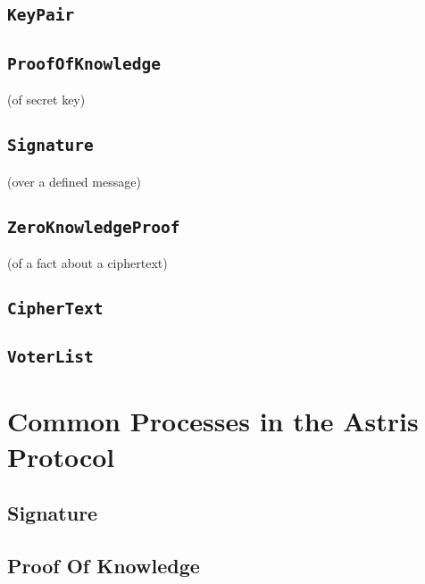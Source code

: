 \section*{\texttt{KeyPair}}
\label{dt:elgamal:keypair}


\section*{\texttt{ProofOfKnowledge}}
\label{dt:elgamal:pok}
(of secret key)

\section*{\texttt{Signature}}
\label{dt:elgamal:sig}
(over a defined message)

\section*{\texttt{ZeroKnowledgeProof}}
\label{dt:elgamal:zkp}
(of a fact about a ciphertext)

\section*{\texttt{CipherText}}
\label{dt:elgamal:ct}

\section*{\texttt{VoterList}}
\label{dt:setup:voterlist}


\chapter{Common Processes in the Astris Protocol}
\label{appendix:processes}

\section*{Signature}
\label{proc:sign}



\section*{Proof Of Knowledge}
\label{proc:pok}

